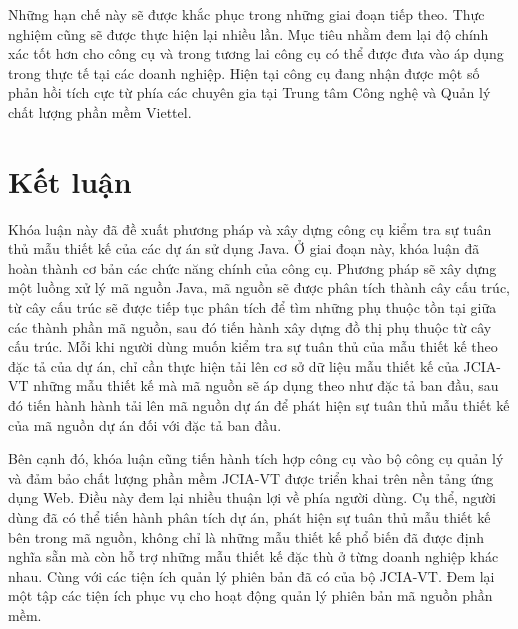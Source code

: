 \documentclass[12pt]{report}
\begin{document}
\noindent Những hạn chế này sẽ được khắc phục trong những giai đoạn tiếp theo. Thực nghiệm cũng sẽ được thực hiện lại nhiều lần. Mục tiêu nhằm đem lại độ chính xác tốt hơn cho công cụ và trong tương lai công cụ có thể được đưa vào áp dụng trong thực tế tại các doanh nghiệp. Hiện tại công cụ đang nhận được một số phản hồi tích cực từ phía các chuyên gia tại Trung tâm Công nghệ và Quản lý chất lượng phần mềm Viettel.

\chapter{Kết luận}
Khóa luận này đã đề xuất phương pháp và xây dựng công cụ kiểm tra sự tuân thủ mẫu thiết kế của các dự án sử dụng Java. Ở giai đoạn này, khóa luận đã hoàn thành cơ bản các chức năng chính của công cụ. Phương pháp sẽ xây dựng một luồng xử lý mã nguồn Java, mã nguồn sẽ được phân tích thành cây cấu trúc, từ cây cấu trúc sẽ được tiếp tục phân tích để tìm những phụ thuộc tồn tại giữa các thành phần mã nguồn, sau đó tiến hành xây dựng đồ thị phụ thuộc từ cây cấu trúc. Mỗi khi người dùng muốn kiểm tra sự tuân thủ của mẫu thiết kế theo đặc tả của dự án, chỉ cần thực hiện tải lên cơ sở dữ liệu mẫu thiết kế của JCIA-VT những mẫu thiết kế mà mã nguồn sẽ áp dụng theo như đặc tả ban đầu, sau đó tiến hành hành tải lên mã nguồn dự án để phát hiện sự tuân thủ mẫu thiết kế của mã nguồn dự án đối với đặc tả ban đầu.

\noindent Bên cạnh đó, khóa luận cũng tiến hành tích hợp công cụ vào bộ công cụ quản lý và đảm bảo chất lượng phần mềm JCIA-VT được triển khai trên nền tảng ứng dụng Web. Điều này đem lại nhiều thuận lợi về phía người dùng. Cụ thể, người dùng đã có thể tiến hành phân tích dự án, phát hiện sự tuân thủ mẫu thiết kế bên trong mã nguồn, không chỉ là những mẫu thiết kế phổ biến đã được định nghĩa sẵn mà còn hỗ trợ những mẫu thiết kế đặc thù ở từng doanh nghiệp khác nhau. Cùng với các tiện ích quản lý phiên bản đã có của bộ JCIA-VT. Đem lại một tập các tiện ích phục vụ cho hoạt động quản lý phiên bản mã nguồn phần mềm.
\end{document}
